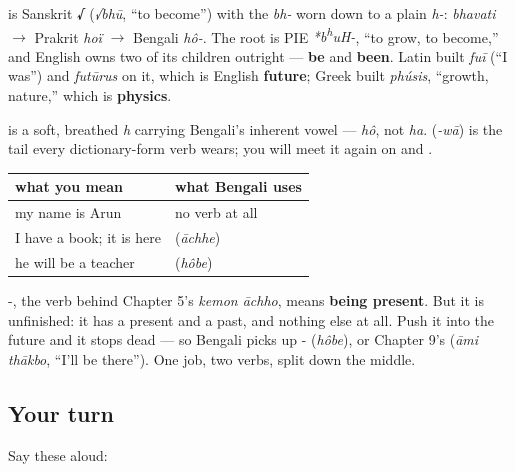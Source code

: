 \begin{cousinweb}
\textbf{} is Sanskrit \textbf{√} (\emph{√bhū}, \textquotedblleft{}to become\textquotedblright{}) with the \emph{bh-} worn down to a plain \emph{h-}: \emph{bhavati} $\to$ Prakrit \emph{hoï} $\to$ Bengali \emph{hô-}. The root is PIE \emph{*b\textsuperscript{h}uH-}, \textquotedblleft{}to grow, to become,\textquotedblright{} and English owns two of its children outright — \textbf{be} and \textbf{been}. Latin built \emph{fuī} (\textquotedblleft{}I was\textquotedblright{}) and \emph{futūrus} on it, which is English \textbf{future}; Greek built \emph{phúsis}, \textquotedblleft{}growth, nature,\textquotedblright{} which is \textbf{physics}.
\end{cousinweb}

\begin{sounds}
\textbf{} is a soft, breathed \emph{h} carrying Bengali's inherent vowel — \emph{hô}, not \emph{ha}. \textbf{} (\emph{-wā}) is the tail every dictionary-form verb wears; you will meet it again on  and .
\end{sounds}

\begin{grammarlens}[title={Grammar Lens: two be-verbs, and one of them is unfinished}]
\noindent
\begin{tabularx}{\linewidth}{@{}>{\raggedright\arraybackslash}X>{\raggedright\arraybackslash}X@{}}
\toprule
\textbf{what you mean} & \textbf{what Bengali uses} \\
\midrule
my name is Arun & no verb at all \\
I have a book; it is here & \textbf{\bn{আছে}} (\emph{āchhe}) \\
he will be a teacher & \textbf{\bn{হবে}} (\emph{hôbe}) \\
\bottomrule
\end{tabularx}

-, the verb behind Chapter 5's \emph{kemon āchho}, means \textbf{being present}. But it is unfinished: it has a present and a past, and nothing else at all. Push it into the future and it stops dead — so Bengali picks up - (\emph{hôbe}), or Chapter 9's  (\emph{āmi thākbo}, \textquotedblleft{}I'll be there\textquotedblright{}). One job, two verbs, split down the middle.
\end{grammarlens}

\subsection*{Your turn}
Say these aloud:

